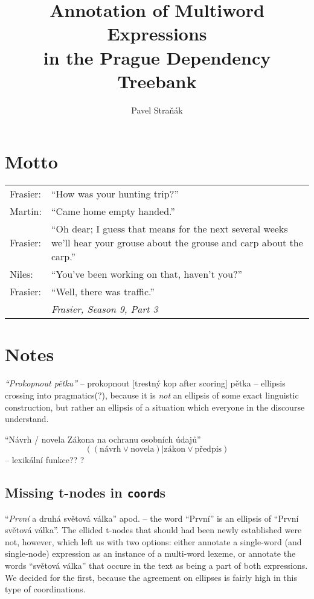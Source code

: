 \documentclass[11pt, a4paper, twopage, titlepage]{book}
\title{Annotation of Multiword Expressions\\
 in the Prague Dependency Treebank}
\author{Pavel Straňák}
\def\code{\texttt}
\begin{document}
\maketitle

\frontmatter
\tableofcontents
\listoffigures
\listoftables

\section*{Motto}
\begin{tabular}{@{} lp{11cm} @{}} %
Frasier: & ``How was your hunting trip?''\\
Martin: & ``Came home empty handed.''\\
Frasier: & ``Oh dear; I guess that means for the next several weeks we'll hear your grouse about the grouse and carp about the carp.''\\
Niles: & ``You've been working on that, haven't you?''\\
Frasier: & ``Well, there was traffic.''\\
 & \raggedleft\emph{Frasier, Season 9, Part 3}\\
\end{tabular}



\newpage
\section{Notes}

{\em``Prokopnout pětku''} -- prokopnout [trestný kop after scoring] pětka -- ellipsis crossing into pragmatics(?), because it is {\em not} an ellipsis of some exact linguistic construction, but rather an ellipsis of a situation which everyone in the discourse understand.  

``Návrh / novela Zákona na ochranu osobních údajů''  $$((\mathrm{návrh} \lor \mathrm{novela}) | \mathrm{zákon} \lor \mathrm{předpis})$$
-- lexikální funkce?? \citep{melcuk:1992} ?

\subsection{Missing t-nodes in \code{coord}s}
``\textit{První} a druhá světová válka'' apod. -- the word ``První'' is an ellipsis of ``První světová válka''. The ellided t-nodes that should had been newly established were not, however, which left us with two options: either annotate a single-word (and single-node) expression as an instance of a multi-word lexeme, or annotate the words ``světová válka'' that occure in the text as being a part of both expressions. We decided for the first, because the agreement on ellipses is fairly high in this type of coordinations.

\mainmatter












\end{document}
